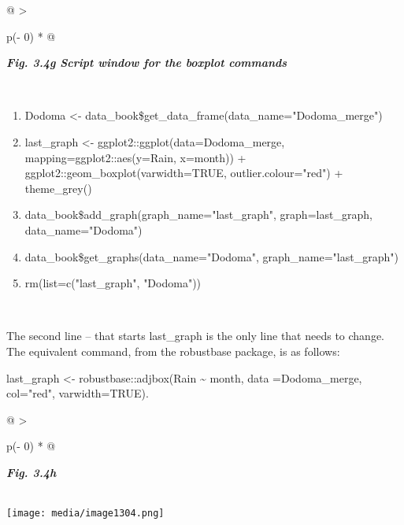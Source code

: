 \documentclass[
  letterpaper,
  DIV=11,
  numbers=noendperiod]{scrreprt}
\begin{document}
\begin{longtable}[]{@{}
  >{\raggedright\arraybackslash}p{(\columnwidth - 0\tabcolsep) * }@{}}
\toprule\noalign{}
\begin{minipage}[b]{\linewidth}\raggedright
\textbf{\emph{Fig. 3.4g Script window for the boxplot commands}}
\end{minipage} \\
\midrule\noalign{}
\endhead
\bottomrule\noalign{}
\endlastfoot
\begin{minipage}[t]{\linewidth}\raggedright
\begin{enumerate}
\def\labelenumi{\arabic{enumi}.}
\item
  Dodoma \textless-
  data\_book\$get\_data\_frame(data\_name="Dodoma\_merge")
\item
  last\_graph \textless- ggplot2::ggplot(data=Dodoma\_merge,
  mapping=ggplot2::aes(y=Rain, x=month)) +
  ggplot2::geom\_boxplot(varwidth=TRUE, outlier.colour="red") +
  theme\_grey()
\item
  data\_book\$add\_graph(graph\_name="last\_graph", graph=last\_graph,
  data\_name="Dodoma")
\item
  data\_book\$get\_graphs(data\_name="Dodoma",
  graph\_name="last\_graph")
\item
  rm(list=c("last\_graph", "Dodoma"))
\end{enumerate}
\end{minipage} \\
\end{longtable}

The second line -- that starts last\_graph is the only line that needs
to change. The equivalent command, from the robustbase package, is as
follows:

last\_graph \textless- robustbase::adjbox(Rain \textasciitilde{} month,
data =Dodoma\_merge, col="red", varwidth=TRUE).

\begin{longtable}[]{@{}
  >{\raggedright\arraybackslash}p{(\columnwidth - 0\tabcolsep) * }@{}}
\toprule\noalign{}
\begin{minipage}[b]{\linewidth}\raggedright
\textbf{\emph{Fig. 3.4h}}
\end{minipage} \\
\midrule\noalign{}
\endhead
\bottomrule\noalign{}
\endlastfoot
\texttt{[image: media/image1304.png]} \\
\end{longtable}
\end{document}
